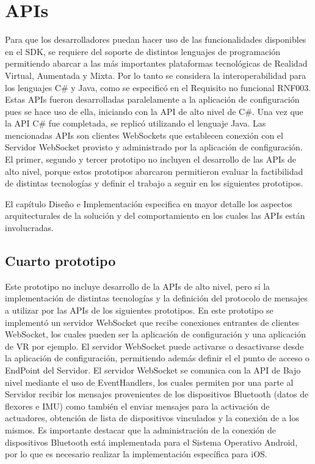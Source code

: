 \section{APIs}
Para que los desarrolladores puedan hacer uso de las funcionalidades disponibles en el SDK, se requiere del soporte de distintos lenguajes de programación permitiendo abarcar a las más importantes plataformas tecnológicas de Realidad Virtual, Aumentada y Mixta. Por lo tanto se considera la interoperabilidad para los lenguajes C\# y Java, como se especificó en el Requisito no funcional RNF003. Estas APIs fueron desarrolladas paralelamente a la aplicación de configuración pues se hace uso de ella, iniciando con la API de alto nivel de C\#. Una vez que la API C\# fue completada, se replicó utilizando el lenguaje Java. Las mencionadas APIs son clientes WebSockets que establecen conexión con el Servidor WebSocket provisto y administrado por la aplicación de configuración. El primer, segundo y tercer prototipo no incluyen el desarrollo de las APIs de alto nivel, porque estos prototipos abarcaron permitieron evaluar la factibilidad de distintas tecnologías y definir el trabajo a seguir en los siguientes prototipos.

El capítulo Diseño e Implementación especifica en mayor detalle los aspectos arquitecturales  de la solución y del comportamiento en los cuales las APIs están involucradas.

\subsection{Cuarto prototipo}
Este prototipo no incluye desarrollo de la APIs de alto nivel, pero si la implementación de distintas tecnologías y la definición del protocolo de mensajes a utilizar por las APIs de los siguientes prototipos. En este prototipo se implementó un servidor WebSocket que recibe conexiones entrantes de clientes WebSocket, los cuales pueden ser la aplicación de configuración y una aplicación de VR por ejemplo. El servidor WebSocket puede activarse o desactivarse desde la aplicación de configuración, permitiendo además definir el el punto de acceso o EndPoint del Servidor. El servidor WebSocket se comunica con la API de Bajo nivel mediante el uso de EventHandlers, los cuales permiten por una parte al Servidor recibir los mensajes provenientes de los dispositivos Bluetooth (datos de flexores e IMU) como también el enviar mensajes para la activación de actuadores, obtención de lista de dispositivos vinculados y la conexión de a los mismos. Es importante destacar que la administración de la conexión de dispositivos Bluetooth está implementada para el Sistema Operativo Android, por lo que es necesario realizar la implementación específica para iOS.
	
